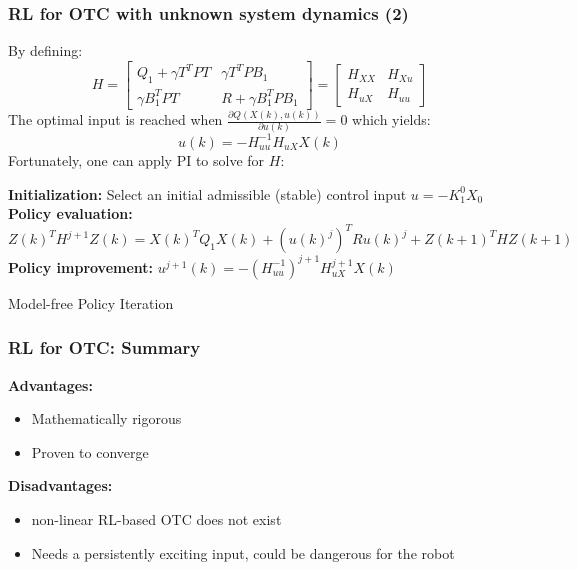 \documentclass{beamer}
\begin{document}
			\begin{frame}\frametitle{RL for OTC with unknown system dynamics (2)}
				\vspace{3mm}
				\fontsize{8}{4}\selectfont 
				By defining:
				\begin{equation}
				H =  \left[\begin{array}{cc}
				Q_1+\gamma T^TPT & \gamma T^TPB_1 \\ 
				\gamma B_1^TPT & R+\gamma B_1^TPB_1
				\end{array}  \right] 
				=\left[ \begin{array}{cc}
				H_{XX} & H_{Xu} \\
				H_{uX} & H_{uu}
				\end{array} \right] 
				\end{equation}
				The optimal input is reached when $ \frac{\partial Q(X(k), u(k))}{\partial u(k)} = 0 $ which yields:
				\begin{equation}
				u(k) = -H_{uu}^{-1}H_{uX}X(k)
				\end{equation} 
				Fortunately, one can apply PI to solve for $ H $:
				\begin{algorithm}[H]
					\begin{algorithmic}[1]
						\fontsize{8}{4}\selectfont
						\STATE \textbf{Initialization:} Select an initial admissible (stable) control input $u = -K^0_1X_0$
						\REPEAT
						\STATE \textbf{Policy evaluation:} 
						\STATE $Z(k)^TH^{j+1}Z(k) = X(k)^TQ_1X(k) + (u(k)^j)^TRu(k)^j + Z(k+1)^THZ(k+1)$
						\STATE \textbf{Policy improvement:} 
						\STATE $ u^{j+1}(k) = -(H_{uu}^{-1})^{j+1} H_{uX}^{j+1}X(k) $ 
						\caption{Model-free Policy Iteration}
					\end{algorithmic}			
				\end{algorithm}
			\end{frame}
			
			\begin{frame}\frametitle{RL for OTC: Summary}				
				\vspace{3mm}
				\textbf{Advantages:}
				\begin{itemize}
					\item Mathematically rigorous
					\item Proven to converge 
				\end{itemize}
				\vspace{3mm}
				\textbf{Disadvantages:}
				\begin{itemize}
					\item non-linear RL-based OTC does not exist 
					\item Needs a persistently exciting input, could be dangerous for the robot				
				\end{itemize}
			\end{frame}				
							
\end{document}

